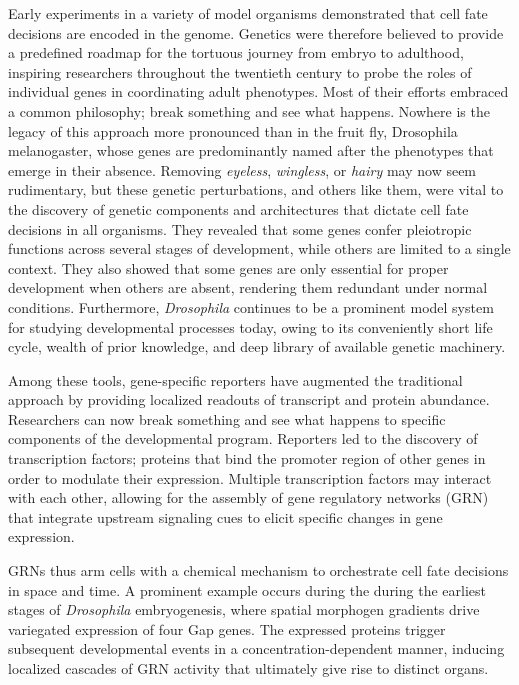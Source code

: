 Early experiments in a variety of model organisms demonstrated that cell fate decisions are encoded in the genome. Genetics were therefore believed to provide a predefined roadmap for the tortuous journey from embryo to adulthood, inspiring researchers throughout the twentieth century to probe the roles of individual genes in coordinating adult phenotypes. Most of their efforts embraced a common philosophy; break something and see what happens. Nowhere is the legacy of this approach more pronounced than in the fruit fly, Drosophila melanogaster, whose genes are predominantly named after the phenotypes that emerge in their absence. Removing \textit{eyeless}, \textit{wingless}, or \textit{hairy} may now seem rudimentary, but these genetic perturbations, and others like them, were vital to the discovery of genetic components and architectures that dictate cell fate decisions in all organisms. They revealed that some genes confer pleiotropic functions across several stages of development, while others are limited to a single context. They also showed that some genes are only essential for proper development when others are absent, rendering them redundant under normal conditions. Furthermore, \emph{Drosophila} continues to be a prominent model system for studying developmental processes today, owing to its conveniently short life cycle, wealth of prior knowledge, and deep library of available genetic machinery.

Among these tools, gene-specific reporters have augmented the traditional approach by providing localized readouts of transcript and protein abundance. Researchers can now break something and see what happens to specific components of the developmental program. Reporters led to the discovery of transcription factors; proteins that bind the promoter region of other genes in order to modulate their expression. Multiple transcription factors may interact with each other, allowing for the assembly of gene regulatory networks (GRN) that integrate upstream signaling cues to elicit specific changes in gene expression. 

GRNs thus arm cells with a chemical mechanism to orchestrate cell fate decisions in space and time. A prominent example occurs during the during the earliest stages of \textit{Drosophila} embryogenesis, where spatial morphogen gradients drive variegated expression of four Gap genes. The expressed proteins trigger subsequent developmental events in a concentration-dependent manner, inducing localized cascades of GRN activity that ultimately give rise to distinct organs. 


